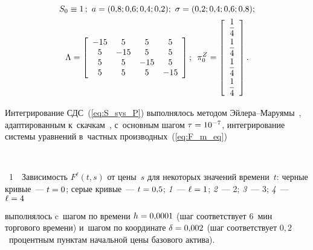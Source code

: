 \begin{multicols}{2}
\vspace*{-3pt}

\noindent
\begin{gather*}
S_0 \equiv 1\,; \ a = (0{,}8; 0{,}6; 0{,}4; 0{,}2); \ \sigma = (0{,}2; 0{,}4; 0{,}6; 0{,}8);
\\
\Lambda = \left[
\begin{array}{cccc}
-15 & 5 & 5 & 5 \\
5 & -15 & 5 & 5 \\
5 & 5 & -15 & 5 \\
5 & 5 & 5 & -15 \\
\end{array}
\right]; \enskip
\pi_0^Z = \left[
\begin{array}{c}
\displaystyle\frac{\displaystyle 1\mathstrut}{\displaystyle 4\mathstrut}  \\
\displaystyle\frac{\displaystyle 1\mathstrut}{\displaystyle 4\mathstrut}  \\
\displaystyle\frac{\displaystyle 1\mathstrut}{\displaystyle 4\mathstrut}  \\
\displaystyle\frac{\displaystyle 1\mathstrut}{\displaystyle 4\mathstrut}  \\
\end{array}
\right].
\end{gather*}

\vspace*{-3pt}

\noindent
Интегрирование СДС~(\ref{eq:S_sys_P}) выполнялось методом Эй\-ле\-ра--Ма\-ру\-ямы~\cite{KP_92}, адап\-ти\-ро\-ван\-ным к~скач\-кам~\cite{PB_10}, 
с~основ\-ным шагом $\tau \hm= 10^{-7}$,
интегрирование сис\-те\-мы уравнений в~част\-ных производных~(\ref{eq:F_m_eq})\linebreak\vspace*{-12pt}

{ \begin{center}  %
 \vspace*{-5pt}
    \mbox{%
\epsfxsize=79mm 
}

\end{center}

\vspace*{-3pt}

\noindent
{{\figurename~1}\ \ \small{Зависимость $F^{\ell}(t,s)$ от цены~$s$ для некоторых значений времени~$t$:
черные кривые~--- $t\hm=0$; серые кривые~--- $t\hm=0{,}5$; \textit{1}~--- $\ell\hm=1$;
\textit{2}~--- 2; 
\textit{3}~--- 3; 
\textit{4}~--- $\ell\hm=4$
}}}

\vspace*{14pt}

\addtocounter{figure}{1}

\noindent
 выполнялось c~шагом по времени 
$h\hm = 0{,}0001$ (шаг соответствует 6~мин торгового времени) и~шагом по координате $\delta \hm= 0{,}002$ (шаг соответствует $0{,}2$~процентным 
пунк\-там начальной цены базового актива).
{

}
\end{multicols}
